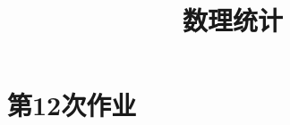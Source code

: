 \documentclass{../mynote}
\title{数理统计}
\begin{document}
\maketitle

\section{第12次作业}

\end{document}

